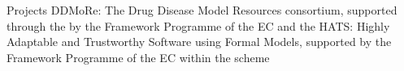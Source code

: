 
\begin{rubric}{Projects}
		DDMoRe: The Drug Disease Model Resources consortium,
		supported through the  by the
		 Framework Programme of the EC and the %
		\hfill{}
		HATS: Highly Adaptable and Trustworthy Software using Formal Models,
		supported by the  Framework Programme of the EC within the
		 scheme%
		\hfill{}
\end{rubric}
